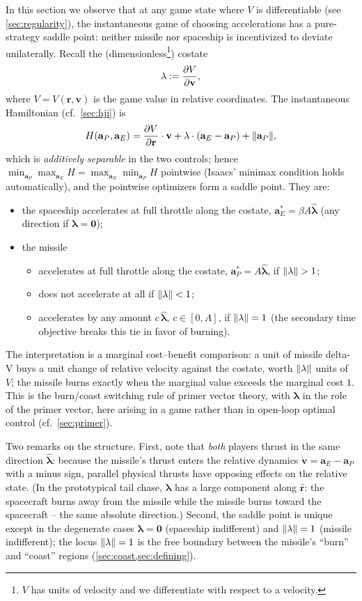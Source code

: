 \documentclass{article}
\newcommand{\eqdef}{:=}
\renewcommand{\vec}[1]{\mathbf{#1}}
\theoremstyle{remark}
\begin{document}
In this section we observe that at any game state where $V$ is differentiable
(see \cref{sec:regularity}), the instantaneous game of choosing accelerations
has a pure-strategy saddle point: neither missile nor spaceship is
incentivized to deviate unilaterally.  Recall the (dimensionless\footnote{$V$
  has units of velocity and we differentiate with respect to a velocity.})
costate
\[
  \vec\lambda \eqdef \pdv{V}{\vec v} ,
\]
where $V = V(\vec r, \vec v)$ is the game value in relative coordinates.  The
instantaneous Hamiltonian (cf.\ \cref{sec:hji}) is
\[
  H(\vec a_P, \vec a_E)
  = \pdv{V}{\vec r} \cdot \vec v
  + \vec\lambda \cdot (\vec a_E - \vec a_P)
  + \norm{\vec a_P},
\]
which is \emph{additively separable} in the two controls; hence
$\min_{\vec a_P} \max_{\vec a_E} H = \max_{\vec a_E} \min_{\vec a_P} H$
pointwise (Isaacs' minimax condition holds automatically), and the pointwise
optimizers form a saddle point.  They are:
\begin{itemize}
\item the spaceship accelerates at full throttle along the costate,
  $\vec a_E^* = \beta A \hat{\vec\lambda}$ (any direction if
  $\vec\lambda = \vec 0$);
\item the missile
  \begin{itemize}
  \item accelerates at full throttle along the costate,
    $\vec a_P^* = A \hat{\vec\lambda}$, if $\norm{\vec\lambda} > 1$;
  \item does not accelerate at all if $\norm{\vec\lambda} < 1$;
  \item accelerates by any amount $c\,\hat{\vec\lambda}$, $c \in [0, A]$, if
    $\norm{\vec\lambda} = 1$ (the secondary time objective breaks this tie in
    favor of burning).
  \end{itemize}
\end{itemize}
The interpretation is a marginal cost--benefit comparison: a unit of missile
delta-V buys a unit change of relative velocity against the costate, worth
$\norm{\vec\lambda}$ units of $V$; the missile burns exactly when the marginal
value exceeds the marginal cost $1$.  This is the burn/coast switching rule
of primer vector theory, with $\vec\lambda$ in the role of the primer vector,
here arising in a game rather than in open-loop optimal control
(cf.\ \cref{sec:primer}).

Two remarks on the structure.  First, note that \emph{both} players thrust in
the same direction $\hat{\vec\lambda}$: because the missile's thrust enters
the relative dynamics $\dot{\vec v} = \vec a_E - \vec a_P$ with a minus sign,
parallel physical thrusts have opposing effects on the relative state.  (In
the prototypical tail chase, $\vec\lambda$ has a large component along
$\hat{\vec r}$: the spacecraft burns away from the missile while the missile
burns toward the spacecraft -- the same absolute direction.)  Second, the
saddle point is unique except in the degenerate cases $\vec\lambda = \vec 0$
(spaceship indifferent) and $\norm{\vec\lambda} = 1$ (missile indifferent);
the locus $\norm{\vec\lambda} = 1$ is the free boundary between the missile's
``burn'' and ``coast'' regions (\cref{sec:coast,sec:defining}).
\end{document}
